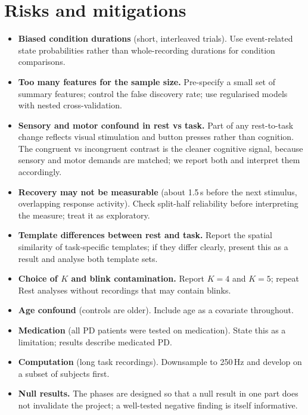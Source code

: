 \documentclass[11pt,a4paper]{article}
\begin{document}
\section{Risks and mitigations}

\begin{itemize}
  \item \textbf{Biased condition durations} (short, interleaved trials). Use event-related state probabilities rather than whole-recording durations for condition comparisons.
  \item \textbf{Too many features for the sample size.} Pre-specify a small set of summary features; control the false discovery rate; use regularised models with nested cross-validation.
  \item \textbf{Sensory and motor confound in rest vs task.} Part of any rest-to-task change reflects visual stimulation and button presses rather than cognition. The congruent vs incongruent contrast is the cleaner cognitive signal, because sensory and motor demands are matched; we report both and interpret them accordingly.
  \item \textbf{Recovery may not be measurable} (about 1.5\,s before the next stimulus, overlapping response activity). Check split-half reliability before interpreting the measure; treat it as exploratory.
  \item \textbf{Template differences between rest and task.} Report the spatial similarity of task-specific templates; if they differ clearly, present this as a result and analyse both template sets.
  \item \textbf{Choice of $K$ and blink contamination.} Report $K=4$ and $K=5$; repeat Rest analyses without recordings that may contain blinks.
  \item \textbf{Age confound} (controls are older). Include age as a covariate throughout.
  \item \textbf{Medication} (all PD patients were tested on medication). State this as a limitation; results describe medicated PD.
  \item \textbf{Computation} (long task recordings). Downsample to 250\,Hz and develop on a subset of subjects first.
  \item \textbf{Null results.} The phases are designed so that a null result in one part does not invalidate the project; a well-tested negative finding is itself informative.
\end{itemize}
\end{document}
